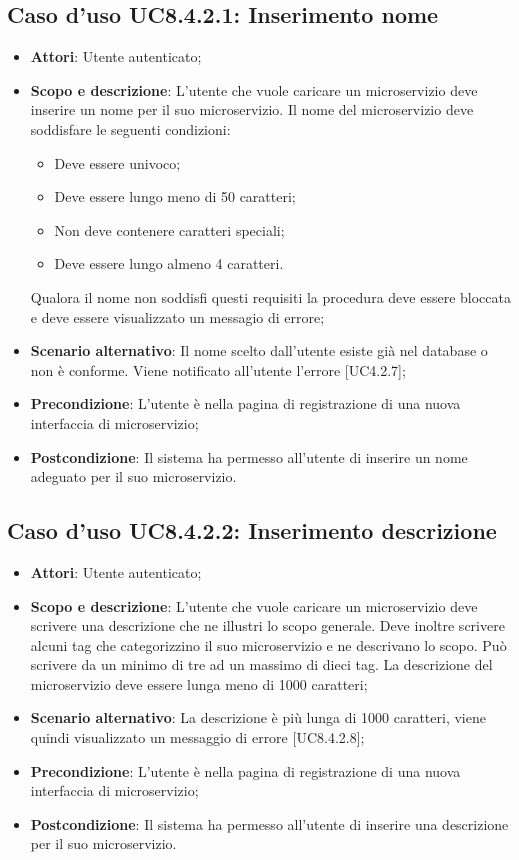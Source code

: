 \documentclass[12pt,a4paper,titlepage]{article}
\begin{document}
	\subsection{Caso d'uso UC8.4.2.1: Inserimento nome}
	\label{UC8.4.2.1}
	\begin{itemize}
		\item \textbf{Attori}: Utente autenticato;
		\item \textbf{Scopo e descrizione}: L'utente che vuole caricare un microservizio deve inserire un nome per il suo microservizio. Il nome del microservizio deve soddisfare le seguenti condizioni:
		\begin{itemize}
			\item Deve essere univoco;
			\item Deve essere lungo meno di 50 caratteri;
			\item Non deve contenere caratteri speciali;
			\item Deve essere lungo almeno 4 caratteri.
		\end{itemize} 
		Qualora il nome non soddisfi questi requisiti la procedura deve essere bloccata e deve essere visualizzato un messagio di errore;
		\item \textbf{Scenario alternativo}: Il nome scelto dall'utente esiste già nel database o non è conforme. Viene notificato all'utente l'errore [UC4.2.7];
		\item \textbf{Precondizione}: L'utente è nella pagina di registrazione di una nuova interfaccia di microservizio;
		\item \textbf{Postcondizione}: Il sistema ha permesso all'utente di inserire un nome adeguato per il suo microservizio.
	\end{itemize}
	\subsection{Caso d'uso UC8.4.2.2: Inserimento descrizione}
	\label{UC8.4.2.2}
	\begin{itemize}
		\item \textbf{Attori}: Utente autenticato;
		\item \textbf{Scopo e descrizione}: L'utente che vuole caricare un microservizio deve scrivere una descrizione che ne illustri lo scopo generale. Deve inoltre scrivere alcuni tag che categorizzino il suo microservizio e ne descrivano lo scopo. Può scrivere da un minimo di tre ad un massimo di dieci tag. La descrizione del microservizio deve essere lunga meno di 1000 caratteri;
		\item \textbf{Scenario alternativo}: La descrizione è più lunga di 1000 caratteri, viene quindi visualizzato un messaggio di errore [UC8.4.2.8];
		\item \textbf{Precondizione}: L'utente è nella pagina di registrazione di una nuova interfaccia di microservizio;
		\item \textbf{Postcondizione}: Il sistema ha permesso all'utente di inserire una descrizione per il suo microservizio.
	\end{itemize}
\end{document}
